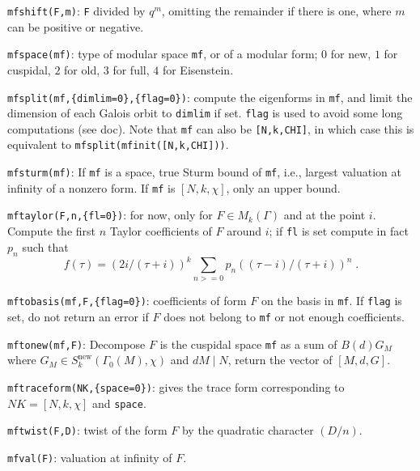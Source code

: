 \documentclass[11pt]{article}
\newcommand{\G}{\Gamma}
\newcommand{\new}{\text{new}}
\def\kbd#1{{\tt #1}}
\begin{document}
\kbd{mfshift(F,m)}: \kbd{F} divided by $q^m$, omitting the remainder if there
is one, where $m$ can be positive or negative.

\kbd{mfspace(mf)}: type of modular space \kbd{mf}, or of a modular form;
$0$ for new, $1$ for cuspidal, $2$ for old, $3$ for full, $4$ for Eisenstein.

\kbd{mfsplit(mf,\{dimlim=0\},\{flag=0\})}: compute the eigenforms in \kbd{mf},
and limit the dimension of each Galois orbit to \kbd{dimlim} if set.
\kbd{flag} is used to avoid some long computations (see doc). Note that
\kbd{mf} can also be \kbd{[N,k,CHI]}, in which case this is equivalent to
\kbd{mfsplit(mfinit([N,k,CHI]))}.

\kbd{mfsturm(mf)}: If \kbd{mf} is a space, true Sturm bound of \kbd{mf}, i.e.,
largest valuation at infinity of a nonzero form. If \kbd{mf} is $[N,k,\chi]$,
only an upper bound.

\kbd{mftaylor(F,n,\{fl=0\})}: for now, only for $F\in M_k(\G)$ and at the
point $i$. Compute the first $n$ Taylor coefficients of $F$ around $i$;
if \kbd{fl} is set compute in fact $p_n$ such that
$$f(\tau)=(2i/(\tau+i))^k\sum_{n>=0}p_n((\tau-i)/(\tau+i))^n\;.$$

\kbd{mftobasis(mf,F,\{flag=0\})}: coefficients of form $F$ on the basis in
\kbd{mf}. If \kbd{flag} is set, do not return an error if $F$ does not
belong to \kbd{mf} or not enough coefficients.

\kbd{mftonew(mf,F)}: Decompose $F$ is the cuspidal space \kbd{mf} as
a sum of $B(d)G_M$ where $G_M\in S_k^{\new}(\G_0(M),\chi)$ and $dM\mid N$,
return the vector of $[M,d,G]$.

\kbd{mftraceform(NK,\{space=0\})}: gives the trace form corresponding to
$NK=[N,k,\chi]$ and \kbd{space}.

\kbd{mftwist(F,D)}: twist of the form $F$ by the quadratic character
$(D/n)$.

\kbd{mfval(F)}: valuation at infinity of $F$.
\end{document}
